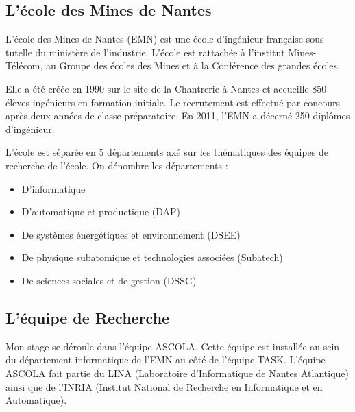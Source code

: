 \documentclass[a4paper, 11pt]{report}
\begin{document}
		\subsection{L'école des Mines de Nantes}
L’école des Mines de Nantes (EMN) est une école d’ingénieur française sous tutelle du ministère de l’industrie. L’école est rattachée à l’institut Mines-Télécom, au Groupe des écoles des Mines et à la Conférence des grandes écoles.

Elle a été créée en 1990 sur le site de la Chantrerie à Nantes et accueille 850 élèves ingénieurs en formation initiale. Le recrutement est effectué par concours après deux années de classe préparatoire. En 2011, l’EMN a décerné 250 diplômes d’ingénieur.

L’école est séparée en 5 départements axé sur les thématiques des équipes de recherche de l'école. On dénombre les départements :
\begin{itemize}
	\item D'informatique
	\item D'automatique et productique (DAP)
	\item De systèmes énergétiques et environnement (DSEE)
	\item De physique subatomique et technologies associées (Subatech)
	\item De sciences sociales et de gestion (DSSG)
\end{itemize}

\subsection{L'équipe de Recherche}
Mon stage se déroule dans l'équipe ASCOLA. Cette équipe est installée au sein du département informatique de l’EMN au côté de l'équipe TASK. L'équipe ASCOLA fait partie du LINA (Laboratoire d'Informatique de Nantes Atlantique) ainsi que de l'INRIA (Institut National de Recherche en Informatique et en Automatique).
\end{document}
